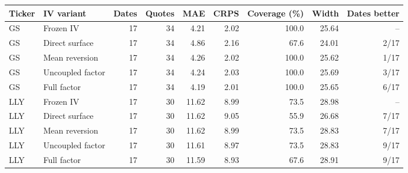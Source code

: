\begin{tabular}{llrrrrrrr}
\toprule
Ticker & IV variant & Dates & Quotes & MAE & CRPS & Coverage (\%) & Width & Dates better \\
\midrule
GS & Frozen IV & 17 & 34 & 4.21 & 2.02 & 100.0 & 25.64 & -- \\
GS & Direct surface & 17 & 34 & 4.86 & 2.16 & 67.6 & 24.01 & 2/17 \\
GS & Mean reversion & 17 & 34 & 4.26 & 2.02 & 100.0 & 25.62 & 1/17 \\
GS & Uncoupled factor & 17 & 34 & 4.24 & 2.03 & 100.0 & 25.69 & 3/17 \\
GS & Full factor & 17 & 34 & 4.19 & 2.01 & 100.0 & 25.65 & 6/17 \\
LLY & Frozen IV & 17 & 30 & 11.62 & 8.99 & 73.5 & 28.98 & -- \\
LLY & Direct surface & 17 & 30 & 11.62 & 9.05 & 55.9 & 26.68 & 7/17 \\
LLY & Mean reversion & 17 & 30 & 11.62 & 8.99 & 73.5 & 28.83 & 7/17 \\
LLY & Uncoupled factor & 17 & 30 & 11.61 & 8.97 & 73.5 & 28.83 & 9/17 \\
LLY & Full factor & 17 & 30 & 11.59 & 8.93 & 67.6 & 28.91 & 9/17 \\
\bottomrule\end{tabular}
